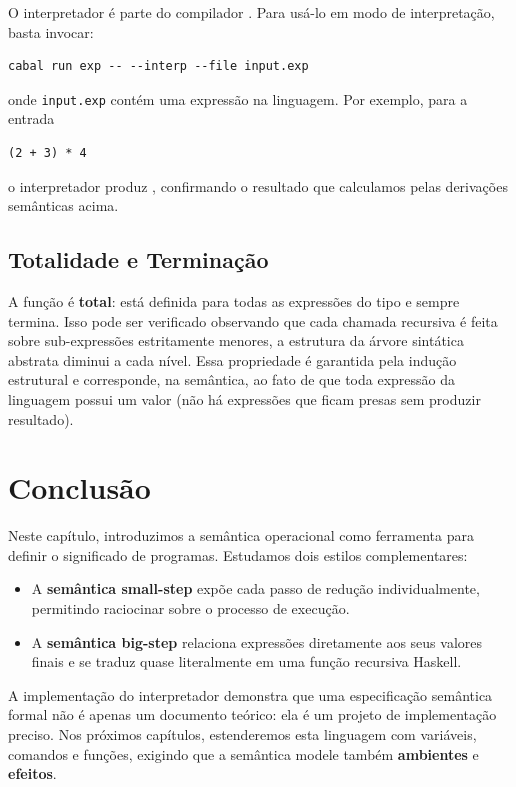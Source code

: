 O interpretador é parte do compilador
. Para usá-lo em modo de interpretação,
basta invocar:

\begin{verbatim}
cabal run exp -- --interp --file input.exp
\end{verbatim}

onde \verb|input.exp| contém uma expressão na
linguagem. Por exemplo, para a entrada

\begin{verbatim}
(2 + 3) * 4
\end{verbatim}

o interpretador produz , confirmando o
resultado que calculamos pelas derivações semânticas acima.

\subsection{Totalidade e Terminação}

A função  é \textbf{total}: está
definida para todas as expressões do tipo
 e sempre termina. Isso pode ser
verificado observando que cada chamada recursiva é feita sobre
sub-expressões estritamente menores, a estrutura da árvore
sintática abstrata diminui a cada nível. Essa propriedade é garantida
pela indução estrutural e corresponde, na semântica, ao fato de que
toda expressão da linguagem possui um valor (não há expressões que
ficam presas sem produzir resultado).

\section{Conclusão}

Neste capítulo, introduzimos a semântica operacional como ferramenta
para definir o significado de programas. Estudamos dois estilos
complementares:

\begin{itemize}
  \item
    A \textbf{semântica small-step} expõe cada passo de redução
    individualmente, permitindo raciocinar sobre o processo de execução.
  \item
    A \textbf{semântica big-step} relaciona expressões diretamente
    aos seus valores finais e se traduz quase literalmente em uma
    função recursiva Haskell.
\end{itemize}

A implementação do interpretador 
demonstra que uma especificação semântica formal não é apenas um
documento teórico: ela é um projeto de implementação preciso. Nos
próximos capítulos, estenderemos esta linguagem com variáveis,
comandos e funções, exigindo que a semântica modele também
\textbf{ambientes} e \textbf{efeitos}.
